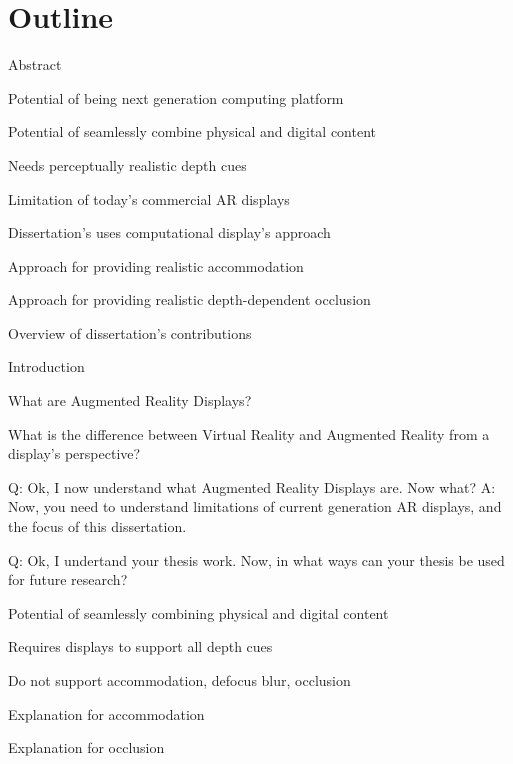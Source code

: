 \section{Outline}
\begin{compact_todolist}
\item Abstract
    \begin{compact_todolist}
    \item Potential of being next generation computing platform
    \item Potential of seamlessly combine physical and digital content
    \item Needs perceptually realistic depth cues
    \item Limitation of today's commercial AR displays
    \item Dissertation's uses computational display's approach
    \item Approach for providing realistic accommodation
    \item Approach for providing realistic depth-dependent occlusion
    \item Overview of dissertation's contributions
    \end{compact_todolist}
\item Introduction
    \begin{compact_todolist}
    \item What are Augmented Reality Displays?
    \item What is the difference between Virtual Reality and Augmented Reality from a display's perspective?
    \item Q: Ok, I now understand what Augmented Reality Displays are. Now what? A: Now, you need to understand limitations of current generation AR displays, and the focus of this dissertation.
    \item Q: Ok, I undertand your thesis work. Now, in what ways can your thesis be used for future research?
    \item Potential of seamlessly combining physical and digital content
    \item Requires displays to support all depth cues
    \item Do not support accommodation, defocus blur, occlusion
    \item Explanation for accommodation
    \item {}
    \item Explanation for occlusion
    \item {}

\end{compact_todolist}
\end{compact_todolist}
